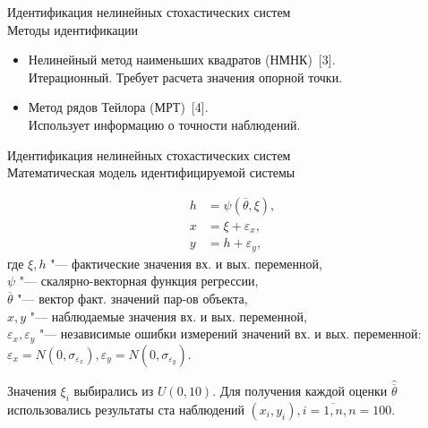 \documentclass[hyperref={pdftex,unicode}]{beamer}
\begin{document}
\begin{frame}{%
    Идентификация нелинейных стохастических систем \\
    \small{Методы идентификации}
  }
  \begin{itemize}
  \item Нелинейный метод наименьших квадратов (НМНК)~[3]. \\
    Итерационный. Требует расчета значения опорной точки.

  \item Метод рядов Тейлора (МРТ)~[4]. \\
    Использует информацию о точности наблюдений.
  \end{itemize}
\end{frame}

\begin{frame}{%
    Идентификация нелинейных стохастических систем \\
    \small{Математическая модель идентифицируемой системы}
  }

  \begin{align*}
    h &= \psi(\overline{\theta}, \xi), \\
    x &= \xi + \varepsilon_x, \\
    y &= h + \varepsilon_y,
  \end{align*}
  где \( \xi, h \)
  "--- фактические значения вх. и вых. переменной, \\
  \hspace*{9.5mm}\( \psi \) "--- скалярно-векторная функция регрессии, \\
  \hspace*{10.3mm}\( \overline{\theta} \)
  "--- вектор факт. значений пар-ов объекта, \\
  \hspace*{6.5mm}\( x, y \) "--- наблюдаемые значения вх. и вых. переменной, \\
  \hspace*{3.7mm}\( \varepsilon_x, \varepsilon_y \)
  "--- независимые ошибки измерений значений вх. и вых. переменной:
\(
\varepsilon_x = N(0, \sigma_{\varepsilon_x}),
\varepsilon_y = N(0, \sigma_{\varepsilon_y})
\).

\bigskip
\scriptsize{%
  Значения \( \xi_i \) выбирались из \( U(0, 10) \).
  Для получения каждой оценки \( \hat{\overline{\theta}} \) использовались результаты
  ста наблюдений \( ( x_i, y_i ), i = \overline{1, n}, n = 100 \).
}
\end{frame}
\end{document}
